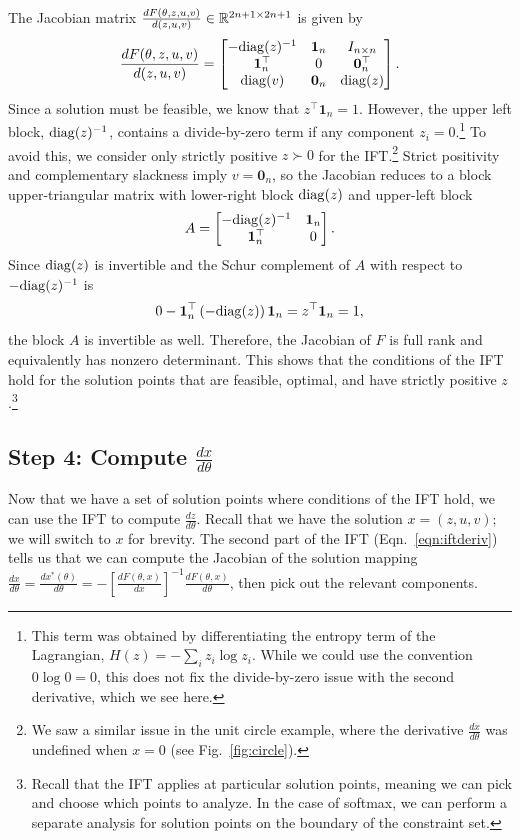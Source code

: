 \documentclass[11pt]{article}
\begin{document}
The Jacobian matrix $\frac{dF(\theta,z,u,v)}{d(z,u,v)}\in\mathbb{R}^{2n+1\times 2n+1}$ is given by
\begin{equation}
\label{eqn:f-jac}
\frac{dF(\theta,z,u,v)}{d(z,u,v)}=
\begin{bmatrix}
-\mathrm{diag}(z)^{-1} & \mathbf{1}_n & I_{n\times n} \\
\mathbf{1}_n^\top & 0 & \mathbf{0}^\top_n\\
\mathrm{diag}(v) & \mathbf{0}_n & \mathrm{diag}(z)
\end{bmatrix}.
\end{equation}
Since a solution must be feasible, we know that $z^\top\mathbf{1}_n=1$.
However, the upper left block, $\mathrm{diag}(z)^{-1}$, contains a divide-by-zero term if
any component $z_i = 0$.\footnote{
This term was obtained by differentiating the entropy
term of the Lagrangian, $H(z) = -\sum_i z_i\log z_i$.
While we could use the convention $0\log 0 = 0$,
this does not fix the divide-by-zero issue with the second derivative, which we see here.
}
To avoid this, we consider only strictly positive $z \succ 0$ for the IFT.\footnote{
We saw a similar issue in the unit circle example, where the derivative
$\frac{dx}{d\theta}$ was undefined when $x=0$ (see Fig.~\ref{fig:circle}).
}
Strict positivity and complementary slackness imply $v=\mathbf{0}_n$,
so the Jacobian reduces to a block upper-triangular matrix with lower-right block $\mathrm{diag}(z)$
and upper-left block
\[
A = \begin{bmatrix}
    -\mathrm{diag}(z)^{-1} & \mathbf{1}_n \\
    \mathbf{1}_n^\top & 0
\end{bmatrix}.
\]
Since $\mathrm{diag}(z)$ is invertible and the Schur complement of $A$ with respect to
$-\mathrm{diag}(z)^{-1}$ is
\[
0 - \mathbf{1}_n^\top \left(-\mathrm{diag}(z)\right)\mathbf{1}_n
= z^\top \mathbf{1}_n = 1,
\]
the block $A$ is invertible as well.
Therefore, the Jacobian of $F$ is full rank and equivalently has nonzero determinant.
This shows that the conditions of the IFT hold for the solution points that are
feasible, optimal, and have strictly positive $z$.\footnote{
Recall that the IFT applies at particular solution points,
meaning we can pick and choose which points to analyze.
In the case of softmax, we can perform a separate analysis
for solution points on the boundary of the constraint set.
}

\subsection*{Step 4: Compute $\frac{dx}{d\theta}$}
Now that we have a set of solution points where conditions of the IFT hold,
we can use the IFT to compute $\frac{dz}{d\theta}$.
Recall that we have the solution $x = (z,u,v)$; we will switch to $x$ for brevity.
The second part of the IFT (Eqn.~\ref{eqn:iftderiv})
tells us that we can compute the Jacobian of the
solution mapping $\frac{dx}{d\theta} = \frac{dx^*(\theta)}{d\theta}
= -\left[\frac{dF(\theta,x)}{dx}\right]^{-1}\frac{dF(\theta,x)}{d\theta}$,
then pick out the relevant components.
\end{document}
